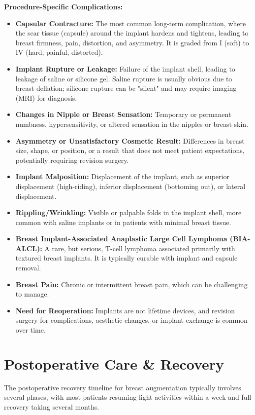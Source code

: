 \textbf{Procedure-Specific Complications:}
\begin{itemize}
  \item \textbf{Capsular Contracture:} The most common long-term complication, where the scar tissue (capsule) around the implant hardens and tightens, leading to breast firmness, pain, distortion, and asymmetry. It is graded from I (soft) to IV (hard, painful, distorted).
  \item \textbf{Implant Rupture or Leakage:} Failure of the implant shell, leading to leakage of saline or silicone gel. Saline rupture is usually obvious due to breast deflation; silicone rupture can be "silent" and may require imaging (MRI) for diagnosis.
  \item \textbf{Changes in Nipple or Breast Sensation:} Temporary or permanent numbness, hypersensitivity, or altered sensation in the nipples or breast skin.
  \item \textbf{Asymmetry or Unsatisfactory Cosmetic Result:} Differences in breast size, shape, or position, or a result that does not meet patient expectations, potentially requiring revision surgery.
  \item \textbf{Implant Malposition:} Displacement of the implant, such as superior displacement (high-riding), inferior displacement (bottoming out), or lateral displacement.
  \item \textbf{Rippling/Wrinkling:} Visible or palpable folds in the implant shell, more common with saline implants or in patients with minimal breast tissue.
  \item \textbf{Breast Implant-Associated Anaplastic Large Cell Lymphoma (BIA-ALCL):} A rare, but serious, T-cell lymphoma associated primarily with textured breast implants. It is typically curable with implant and capsule removal.
  \item \textbf{Breast Pain:} Chronic or intermittent breast pain, which can be challenging to manage.
  \item \textbf{Need for Reoperation:} Implants are not lifetime devices, and revision surgery for complications, aesthetic changes, or implant exchange is common over time.
\end{itemize}

\section*{Postoperative Care \& Recovery}
The postoperative recovery timeline for breast augmentation typically involves several phases, with most patients resuming light activities within a week and full recovery taking several months.

